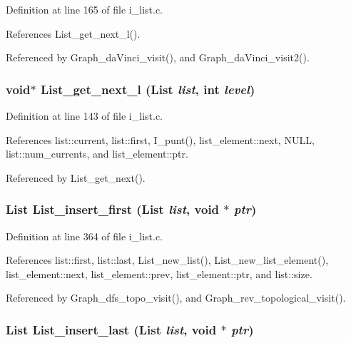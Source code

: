 Definition at line 165 of file i\_\-list.c.

References List\_\-get\_\-next\_\-l().

Referenced by Graph\_\-da\-Vinci\_\-visit(), and Graph\_\-da\-Vinci\_\-visit2().
\subsubsection{\setlength{\rightskip}{0pt plus 5cm}void$\ast$ List\_\-get\_\-next\_\-l (\bf{List} {\em list}, int {\em level})}\label{i__list_8c_ba9f38d279f80d663b1a07de417e4d81}




Definition at line 143 of file i\_\-list.c.

References list::current, list::first, I\_\-punt(), list\_\-element::next, NULL, list::num\_\-currents, and list\_\-element::ptr.

Referenced by List\_\-get\_\-next().
\subsubsection{\setlength{\rightskip}{0pt plus 5cm}\bf{List} List\_\-insert\_\-first (\bf{List} {\em list}, void $\ast$ {\em ptr})}\label{i__list_8c_d760aaef744064bc602600d2c1136dfd}




Definition at line 364 of file i\_\-list.c.

References list::first, list::last, List\_\-new\_\-list(), List\_\-new\_\-list\_\-element(), list\_\-element::next, list\_\-element::prev, list\_\-element::ptr, and list::size.

Referenced by Graph\_\-dfs\_\-topo\_\-visit(), and Graph\_\-rev\_\-topological\_\-visit().
\subsubsection{\setlength{\rightskip}{0pt plus 5cm}\bf{List} List\_\-insert\_\-last (\bf{List} {\em list}, void $\ast$ {\em ptr})}\label{i__list_8c_c38e6bec0b49dcd3a6a831d57a5997ee}




